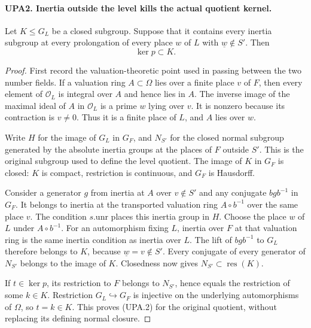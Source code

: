 \documentclass[11pt,a4paper]{article}
\numberwithin{equation}{section}
\theoremstyle{remark}\newtheorem{remark}[theorem]{Remark}
\begin{document}
\paragraph{UPA2. Inertia outside the level kills the actual quotient kernel.}
\label{claim:UPA2}
Let $K\leq G_L$ be a closed subgroup.  Suppose that it contains every
inertia subgroup at every prolongation of every place $w$ of $L$
with $\underline w\notin S'$.  Then
\[
                         \ker p\subset K.                    \tag{UPA.2}
\]
\begin{proof}
First record the valuation-theoretic point used in passing between
the two number fields.  If a valuation ring $A\subset\Omega$ lies
over a finite place $v$ of $F$, then every element of $\mathcal O_L$
is integral over $A$ and hence lies in $A$.  The inverse image of
the maximal ideal of $A$ in $\mathcal O_L$ is a prime $w$ lying
over $v$.  It is nonzero because its contraction is $v\ne0$.
Thus it is a finite place of $L$, and $A$ lies over $w$.

Write $H$ for the image of $G_L$ in $G_F$, and $N_{S'}$ for the
closed normal subgroup generated by the absolute inertia groups
at the places of $F$ outside $S'$.  This is the original subgroup
used to define the level quotient.  The image of $K$ in $G_F$
is closed: $K$ is compact, restriction is continuous, and $G_F$
is Hausdorff.

Consider a generator $g$ from inertia at $A$ over
$v\notin S'$ and any conjugate $bgb^{-1}$ in $G_F$.
It belongs to inertia at the transported valuation ring
$A\circ b^{-1}$ over the same place $v$.  The condition
$s.\mathrm{unr}$ places this inertia group in $H$.
Choose the place $w$ of $L$ under $A\circ b^{-1}$.
For an automorphism fixing $L$, inertia over $F$ at that
valuation ring is the same inertia condition as inertia over $L$.
The lift of $bgb^{-1}$ to $G_L$ therefore belongs to $K$,
because $\underline w=v\notin S'$.
Every conjugate of every generator of $N_{S'}$ belongs to
the image of $K$.  Closedness now gives
$N_{S'}\subset\operatorname{res}(K)$.

If $t\in\ker p$, its restriction to $F$ belongs to $N_{S'}$,
hence equals the restriction of some $k\in K$.
Restriction $G_L\hookrightarrow G_F$ is injective on the
underlying automorphisms of $\Omega$, so $t=k\in K$.
This proves (UPA.2) for the original quotient, without replacing
its defining normal closure.
\end{proof}

\end{document}
